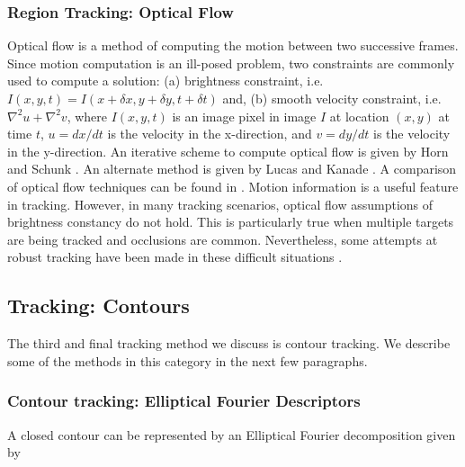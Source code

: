 \documentclass[12pt,letterpaper,doublespaced,ETD,proposal]{gt-ece-thesis}
\begin{document}
\begin{Body}
\subsubsection{Region Tracking: Optical Flow}
Optical flow is a method of computing the motion between two successive frames.  Since motion computation is an ill-posed problem, two constraints are commonly used to compute a solution: (a) brightness constraint, i.e. $I(x,y,t) = I(x+\delta x,y+\delta y,t+\delta t)$ and, (b) smooth velocity constraint, i.e. $\nabla^2 u + \nabla^2 v$, where $I(x,y,t)$ is an image pixel in image $I$ at location $(x,y)$ at time $t$, $u=dx/dt$ is the velocity in the x-direction, and $v=dy/dt$ is the velocity in the y-direction.  An iterative scheme to compute optical flow is given by Horn and Schunk \cite{1981_JNL_OpticalFlow_HornSchunck}.  An alternate method is given by Lucas and Kanade \cite{1981_CNF_IterativeImageRegistration_LucasKanade}.  A comparison of optical flow techniques can be found in \cite{1994_JNL_PerfOpticalFlow_Barron}.  Motion information is a useful feature in tracking.  However, in many tracking scenarios, optical flow assumptions of brightness constancy do not hold.  This is particularly true when multiple targets are being tracked and occlusions are common.  Nevertheless, some attempts at robust tracking have been made in these difficult situations \cite{1996_CNF_MultipleMotionsFlowFields_Black}.

\subsection{Tracking: Contours}
The third and final tracking method we discuss is contour tracking.  We describe some of the methods in this category in the next few paragraphs.

\subsubsection{Contour tracking: Elliptical Fourier Descriptors}
A closed contour can be represented by an Elliptical Fourier decomposition \cite{1982_JNL_EllipticalFourier_Kuhl} given by


\end{Body}
\end{document}
